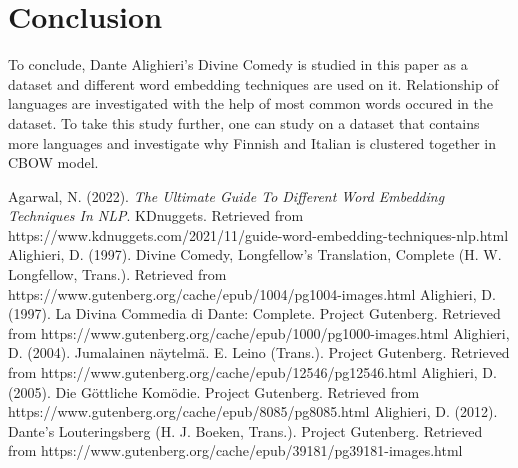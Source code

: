 \documentclass[man]{apa7}
\begin{document}
\section{Conclusion}
To conclude, Dante Alighieri's Divine Comedy is studied in this paper as a dataset and different word embedding techniques are used on it. Relationship of languages are investigated with the help of most common words occured in the dataset. To take this study further, one can study on a dataset that contains more languages and investigate why Finnish and Italian is clustered together in CBOW model. 
\newpage
\begin{thebibliography}{7}
Agarwal, N. (2022). \emph{The Ultimate Guide To Different Word Embedding Techniques In NLP}. KDnuggets. Retrieved from https://www.kdnuggets.com/2021/11/guide-word-embedding-techniques-nlp.html
Alighieri, D. (1997). Divine Comedy, Longfellow's Translation, Complete (H. W. Longfellow, Trans.). Retrieved from https://www.gutenberg.org/cache/epub/1004/pg1004-images.html
Alighieri, D. (1997). La Divina Commedia di Dante: Complete. Project Gutenberg. Retrieved from https://www.gutenberg.org/cache/epub/1000/pg1000-images.html
Alighieri, D. (2004). Jumalainen näytelmä. E. Leino (Trans.). Project Gutenberg. Retrieved from https://www.gutenberg.org/cache/epub/12546/pg12546.html
Alighieri, D. (2005). Die Göttliche Komödie. Project Gutenberg. Retrieved from https://www.gutenberg.org/cache/epub/8085/pg8085.html
Alighieri, D. (2012). Dante's Louteringsberg (H. J. Boeken, Trans.). Project Gutenberg. Retrieved from https://www.gutenberg.org/cache/epub/39181/pg39181-images.html





\end{thebibliography}
\end{document}
